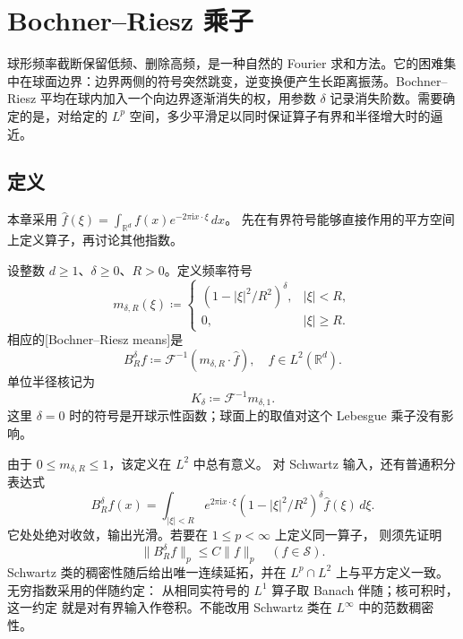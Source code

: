 \section{Bochner–Riesz 乘子}
\label{b2:sec:2401}

球形频率截断保留低频、删除高频，是一种自然的 Fourier 求和方法。它的困难集中在球面边界：边界两侧的符号突然跳变，逆变换便产生长距离振荡。Bochner–Riesz 平均在球内加入一个向边界逐渐消失的权，用参数 \(\delta\) 记录消失阶数。需要确定的是，对给定的 \(L^p\) 空间，多少平滑足以同时保证算子有界和半径增大时的逼近。

\subsection{定义}
\label{b2:subsec:240101}

本章采用
\(\widehat f(\xi)=\int_{\mathbb R^d}f(x)e^{-2\pi\mathrm i x\cdot\xi}\,dx\)。
先在有界符号能够直接作用的平方空间上定义算子，再讨论其他指数。

\begin{definition}\label{b2:def:24-bochner-riesz}
设整数 \(d\geq1\)、\(\delta\geq0\)、\(R>0\)。定义频率符号
\[
 m_{\delta,R}(\xi)\coloneqq
 \begin{cases}
 (1-|\xi|^2/R^2)^\delta,&|\xi|<R,\\
 0,&|\xi|\geq R.
 \end{cases}
\]
相应的[Bochner--Riesz means]是
\[
 B_R^\delta f\coloneqq
       \mathcal F^{-1}(m_{\delta,R}\cdot\widehat f),
 \quad f\in L^2(\mathbb R^d).
\]
单位半径核记为
\[
 K_\delta\coloneqq\mathcal F^{-1}m_{\delta,1}.
\]
这里 \(\delta=0\) 时的符号是开球示性函数；球面上的取值对这个
Lebesgue 乘子没有影响。
\end{definition}

由于 \(0\leq m_{\delta,R}\leq1\)，该定义在 \(L^2\) 中总有意义。
对 Schwartz 输入，还有普通积分表达式
\[
 B_R^\delta f(x)
 =\int_{|\xi|<R}e^{2\pi\mathrm i x\cdot\xi}
           (1-|\xi|^2/R^2)^\delta\widehat f(\xi)\,d\xi.
\]
它处处绝对收敛，输出光滑。若要在 \(1\leq p<\infty\) 上定义同一算子，
则须先证明
\[
 \|B_R^\delta f\|_p\leq C\|f\|_p
       \quad(f\in\mathcal S).
\]
Schwartz 类的稠密性随后给出唯一连续延拓，并在 \(L^p\cap L^2\)
上与平方定义一致。无穷指数采用的伴随约定：
从相同实符号的 \(L^1\) 算子取 Banach 伴随；核可积时，这一约定
就是对有界输入作卷积。不能改用 Schwartz 类在 \(L^\infty\) 中的范数稠密性。

